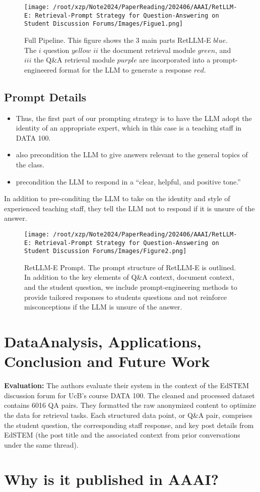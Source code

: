 \documentclass{article}
\begin{document}
\begin{figure}[H]
    \centering
    \texttt{[image: /root/xzp/Note2024/PaperReading/202406/AAAI/RetLLM-E: Retrieval-Prompt Strategy for Question-Answering on Student Discussion Forums/Images/Figue1.png]}
    \caption{Full Pipeline. This figure shows the 3 main parts RetLLM-E \(blue\). The \(i\) question \(yellow\) \(ii\) the document retrieval module \(green\), and \(iii\) the Q\&A retrieval module \(purple\) are incorporated into a prompt-engineered format for the LLM to generate a response \(red\).}
\end{figure}

\subsection{Prompt Details}
\begin{itemize}
    \item Thus, the first part of our prompting strategy is to have the LLM adopt the identity of an appropriate expert, which in this case is a teaching staff in DATA 100.
    \item also precondition the LLM to give answers relevant to the general topics of the class.
    \item precondition the LLM to respond in a “clear, helpful, and positive tone.”
\end{itemize}

In addition to pre-conditing the LLM to take on the identity and style of experienced teaching staff, they tell the LLM not to respond if it is unsure of the answer.

\begin{figure}[H]
    \centering
    \texttt{[image: /root/xzp/Note2024/PaperReading/202406/AAAI/RetLLM-E: Retrieval-Prompt Strategy for Question-Answering on Student Discussion Forums/Images/Figure2.png]}
    \caption{RetLLM-E Prompt. The prompt structure of RetLLM-E is outlined. In addition to the key elements of Q\&A context, document context, and the student question, we include prompt-engineering methods to provide tailored responses to students\textquotesingle{} questions and not reinforce misconceptions if the LLM is unsure of the answer.}
\end{figure}

\section{DataAnalysis, Applications, Conclusion and Future Work}

\textbf{Evaluation:} The authors evaluate their system in the context of the EdSTEM discussion forum for UcB's course DATA 100. The cleaned and processed dataset contains 6016 QA pairs.
They formatted the raw anonymized content to optimize the data for retrieval tasks. Each structured data point, or Q\&A pair, comprises the student question, the corresponding staff response, and key post details from EdSTEM
(the post title and the associated context from prior conversations under the same thread).

\section{Why is it published in AAAI?}
\end{document}
